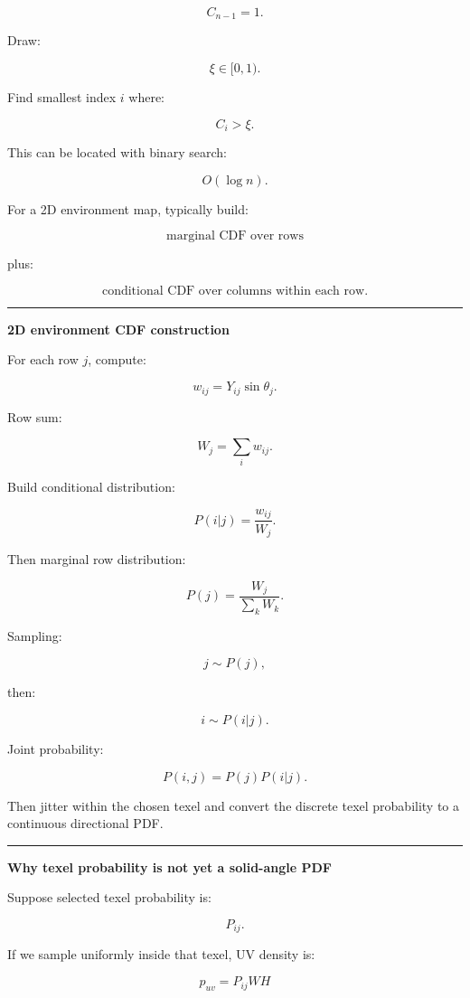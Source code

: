 \[
C_{n-1}=1.
\]

Draw:

\[
\xi\in[0,1).
\]

Find smallest index \(i\) where:

\[
C_i>\xi.
\]

This can be located with binary search:

\[
O(\log n).
\]

For a 2D environment map, typically build:

\[
\boxed{
\text{marginal CDF over rows}
}
\]

plus:

\[
\boxed{
\text{conditional CDF over columns within each row}.
}
\]

\begin{center}\rule{0.5\linewidth}{0.5pt}\end{center}

\textbf{2D environment CDF construction}

For each row \(j\), compute:

\[
w_{ij}
=
Y_{ij}\sin\theta_j.
\]

Row sum:

\[
W_j=
\sum_iw_{ij}.
\]

Build conditional distribution:

\[
P(i|j)
=
\frac{w_{ij}}{W_j}.
\]

Then marginal row distribution:

\[
P(j)
=
\frac{W_j}{\sum_kW_k}.
\]

Sampling:

\[
j\sim P(j),
\]

then:

\[
i\sim P(i|j).
\]

Joint probability:

\[
\boxed{
P(i,j)=P(j)P(i|j).
}
\]

Then jitter within the chosen texel and convert the discrete texel probability to a continuous directional PDF.

\begin{center}\rule{0.5\linewidth}{0.5pt}\end{center}

\textbf{Why texel probability is not yet a solid-angle PDF}

Suppose selected texel probability is:

\[
P_{ij}.
\]

If we sample uniformly inside that texel, UV density is:

\[
p_{uv}
=
P_{ij}
WH
\]

